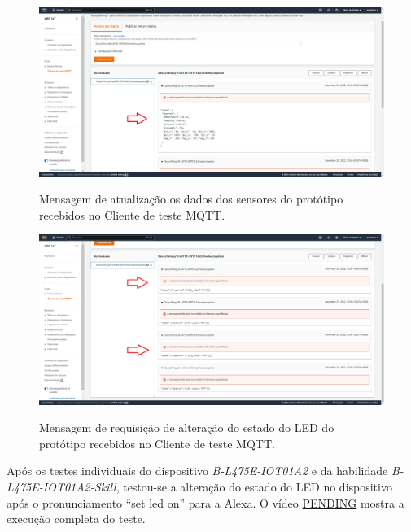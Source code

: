 \begin{figure}[htbp]
	\centering
	\caption{Mensagem de atualização os dados dos sensores do protótipo recebidos no Cliente de teste MQTT.}
	\includegraphics[scale=0.315]{Imagens/cliente_de_teste_mqtt_sensores.png}
	\label{fig:cliente_de_teste_mqtt_sensores}
\end{figure}

\begin{figure}[htbp]
	\centering
	\caption{Mensagem de requisição de alteração do estado do LED do protótipo recebidos no Cliente de teste MQTT.}
	\includegraphics[scale=0.315]{Imagens/cliente_de_teste_mqtt_led_state.png}
	\label{fig:cliente_de_teste_mqtt_led_state}
\end{figure}

Após os testes individuais do dispositivo \textit{B-L475E-IOT01A2} e da habilidade \textit{B-L475E-IOT01A2-Skill}, testou-se a alteração do estado do LED no dispositivo após o pronunciamento ``set led on'' para a Alexa. O vídeo \href{https://github.com/guiguitz}{PENDING} mostra a execução completa do teste.
